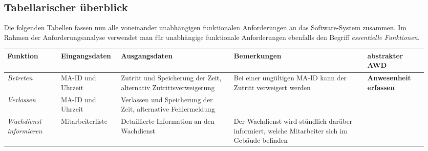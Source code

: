 \subsection{Tabellarischer überblick}
Die folgenden Tabellen fassen nun alle voneinander unabhängigen funktionalen Anforderungen an das Software-System zusammen. Im Rahmen der Anforderungsanalyse verwendet man für unabhängige funktionale Anforderungen ebenfalls den Begriff \textit{essentielle Funktionen}.

{
\vspace{1cm}
\hspace{-3,5cm}
\footnotesize
\begin{tabular}{|p{3cm}|p{4cm}|p{4cm}|p{4cm}|p{2cm}|}
	\hline
		\textbf{Funktion} &
		\textbf{Eingangsdaten} &
		\textbf{Ausgangsdaten} &
		\textbf{Bemerkungen} &
		\textbf{abstrakter AWD} \\
	\hline \hline
		\textit{Betreten} &
		MA-ID und Uhrzeit &
		Zutritt und Speicherung der Zeit, alternativ Zutrittsverweigerung &
		Bei einer ungültigen MA-ID kann der Zutritt verweigert werden &
		\textbf{Anwesenheit erfassen} \\
	\cline{1-4}
		\textit{Verlassen} &
		MA-ID und Uhrzeit &
		Verlassen und Speicherung der Zeit, alternative Fehlermeldung &
		&
		\\
	\cline{1-4}
		\textit{Wachdienst \mbox{informieren}} &
		Mitarbeiterliste &
		Detaillierte Information an den Wachdienst &
		Der Wachdienst wird stündlich darüber informiert, welche Mitarbeiter sich im Gebäude befinden &
		\\
	\hline
\end{tabular}
}


